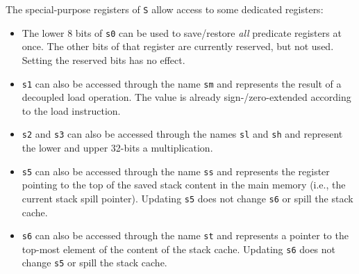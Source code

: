 \documentclass[a4paper,fontsize=10pt,twoside,DIV15,BCOR12mm,headinclude=true,footinclude=false,pagesize,bibtotoc]{scrbook}
\newcommand{\comment}[3]{

\textsf{\textbf{#1}} {\color{#3}#2}}
\newcommand{\stefan}[1]{\comment{Stefan}{#1}{RoyalPurple}}
\renewcommand{\stefan}[1]{}
\begin{document}
The special-purpose registers of \texttt{S} allow access to some dedicated
registers:
\begin{itemize}
  \item The lower $8$ bits of \texttt{s0} can be used to save/restore
    \emph{all} predicate registers at once. The other bits of that
    register are currently reserved, but not used. Setting the reserved
	bits has no effect.
  \item \texttt{s1} can also be accessed through the name \texttt{sm} and
    represents the result of a decoupled load operation. The value is
    already sign-/zero-extended according to the load instruction.
  \item \texttt{s2} and \texttt{s3} can also be accessed through the names
    \texttt{sl} and \texttt{sh} and represent the lower and upper
    32-bits a multiplication.
  \item \texttt{s5} can also be accessed through the name \texttt{ss} and
    represents the register pointing to the top of the saved stack
	content in the main memory (i.e., the current stack spill pointer).
	Updating \texttt{s5} does not change \texttt{s6} or spill the stack cache.
  \item \texttt{s6} can also be accessed through the name \texttt{st} and
    represents a pointer to the top-most element of the content of the
    stack cache.
	Updating \texttt{s6} does not change \texttt{s5} or spill the stack cache.
\end{itemize}

\stefan{None of the registers should be read-only, as they need to be restored when
we switch contexts.}
\end{document}
